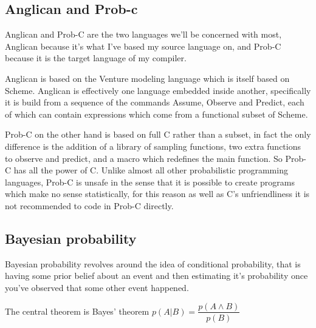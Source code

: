 \documentclass[a4paper]{article}
\begin{document}
\subsection{Anglican and Prob-c}

Anglican and Prob-C are the two languages we'll be concerned with most, Anglican because it's what I've based my source language on, and Prob-C because it is the target language of my compiler.

Anglican is based on the Venture modeling language which is itself based on Scheme. Anglican is effectively one language embedded inside another, specifically it is build from a sequence of the commands Assume, Observe and Predict, each of which can contain expressions which come from a functional subset of Scheme.

Prob-C on the other hand is based on full C rather than a subset, in fact the only difference is the addition of a library of sampling functions, two extra functions to observe and predict, and a macro which redefines the main function. So Prob-C has all the power of C. Unlike almost all other probabilistic programming languages, Prob-C is unsafe in the sense that it is possible to create programs which make no sense statistically, for this reason as well as C's unfriendliness it is not recommended to code in Prob-C directly.




\subsection{Bayesian probability}

Bayesian probability revolves around the idea of conditional probability, that is having some prior belief about an event and then estimating it's probability once you've observed that some other event happened.

The central theorem is Bayes' theorem \(p(A | B) = \dfrac{p(A \land B)}{p(B)}\)



\end{document}
